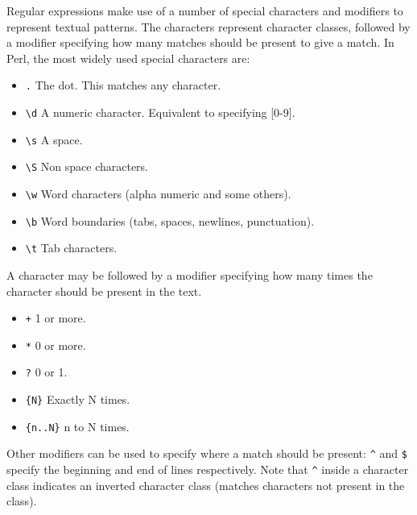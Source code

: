 \documentclass[11pt]{article}
\begin{document}
Regular expressions make use of a number of special characters and
modifiers to represent textual patterns. The characters represent
character classes, followed by a modifier specifying how many matches
should be present to give a match. In Perl, the most widely used special
characters are:

\begin{itemize}
\item \texttt{.} The dot. This matches any character.

\item \texttt{\textbackslash{}d} A numeric character. Equivalent to specifying [0-9].

\item \texttt{\textbackslash{}s} A space.

\item \texttt{\textbackslash{}S} Non space characters.

\item \texttt{\textbackslash{}w} Word characters (alpha numeric and some others).

\item \texttt{\textbackslash{}b} Word boundaries (tabs, spaces, newlines, punctuation).

\item \texttt{\textbackslash{}t} Tab characters.
\end{itemize}

A character may be followed by a modifier specifying how many times the
character should be present in the text.

\begin{itemize}
\item \texttt{+} 1 or more.

\item \texttt{*} 0 or more.

\item \texttt{?} 0 or 1.

\item \texttt{\{N\}} Exactly N times.

\item \texttt{\{n..N\}} n to N times.
\end{itemize}

Other modifiers can be used to specify where a match should be present:
\texttt{\textasciicircum{}} and \texttt{\$} specify the beginning and end of lines respectively. Note
that \texttt{\textasciicircum{}} inside a character class indicates an inverted character class
(matches characters not present in the class).
\end{document}
